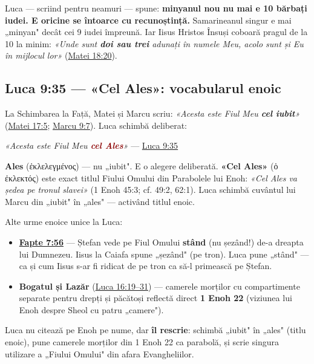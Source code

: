 \documentclass[12pt,a4paper,twoside,openany]{book}
\begin{document}
Luca — scriind pentru neamuri — spune: \textbf{minyanul nou nu mai e 10 bărbați iudei. E oricine se întoarce cu recunoștință.} Samarineanul singur e mai „minyan" decât cei 9 iudei împreună. Iar Iisus Hristos Însuși coboară pragul de la 10 la minim: \textit{«Unde sunt \textbf{doi sau trei} adunați în numele Meu, acolo sunt și Eu în mijlocul lor»} (\href{https://bibliaortodoxa.ro/carte.php?id=55\&cap=18\#20}{Matei 18:20}).


\subsection{Luca 9:35 — «Cel Ales»: vocabularul enoic}
La Schimbarea la Față, Matei și Marcu scriu: \textit{«Acesta este Fiul Meu \textbf{cel iubit}»} (\href{https://bibliaortodoxa.ro/carte.php?id=55\&cap=17\#5}{Matei 17:5}; \href{https://bibliaortodoxa.ro/carte.php?id=53\&cap=9\#7}{Marcu 9:7}). Luca schimbă deliberat:

\textit{«Acesta este Fiul Meu \textcolor{darkred}{\textbf{cel Ales}}»} — \href{https://bibliaortodoxa.ro/carte.php?id=48\&cap=9\#35}{Luca 9:35}

\textbf{Ales} (ἐκλελεγμένος) — nu „iubit". E o alegere deliberată. \textbf{«Cel Ales»} (ὁ ἐκλεκτός) este exact titlul Fiului Omului din Parabolele lui Enoh: \textit{«Cel Ales va ședea pe tronul slavei»} (1 Enoh 45:3; cf. 49:2, 62:1). Luca schimbă cuvântul lui Marcu din „iubit" în „ales" — activând titlul enoic.

Alte urme enoice unice la Luca:

\begin{itemize}
  \item \textbf{\href{https://bibliaortodoxa.ro/carte.php?id=26\&cap=7\#56}{Fapte 7:56}} — Ștefan vede pe Fiul Omului \textbf{stând} (nu șezând!) de-a dreapta lui Dumnezeu. Iisus la Caiafa spune „șezând" (pe tron). Luca pune „stând" — ca și cum Iisus s-ar fi ridicat de pe tron ca să-l primească pe Ștefan.
  \item \textbf{Bogatul și Lazăr} (\href{https://bibliaortodoxa.ro/carte.php?id=48\&cap=16\#19}{Luca 16:19–31}) — camerele morților cu compartimente separate pentru drepți și păcătoși reflectă direct \textbf{1 Enoh 22} (viziunea lui Enoh despre Sheol cu patru „camere").
\end{itemize}
Luca nu citează pe Enoh pe nume, dar \textbf{îl rescrie}: schimbă „iubit" în „ales" (titlu enoic), pune camerele morților din 1 Enoh 22 ca parabolă, și scrie singura utilizare a „Fiului Omului" din afara Evangheliilor.
\end{document}
